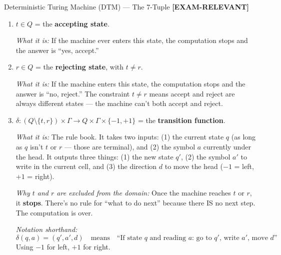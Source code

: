 \documentclass[11pt,a4paper]{article}
\newcommand{\kemark}{\textcolor{red!70!black}{\textbf{[EXAM-RELEVANT]}}}
\begin{document}
\begin{definitionbox}{Deterministic Turing Machine (DTM) --- The 7-Tuple \kemark}
\begin{enumerate}
\textit{What it is:} The state the machine is in at the very beginning, before it reads anything.

\textit{In our example:} $s = q_r$.

\item $t \in Q$ = the \textbf{accepting state}.

\textit{What it is:} If the machine ever enters this state, the computation stops and the answer is ``yes, accept.''

\item $r \in Q$ = the \textbf{rejecting state}, with $t \neq r$.

\textit{What it is:} If the machine enters this state, the computation stops and the answer is ``no, reject.'' The constraint $t \neq r$ means accept and reject are always different states --- the machine can't both accept and reject.

\item $\delta\colon (Q \setminus \{t, r\}) \times \Gamma \to Q \times \Gamma \times \{-1, +1\}$ = the \textbf{transition function}.

\textit{What it is:} The rule book. It takes two inputs: (1) the current state $q$ (as long as $q$ isn't $t$ or $r$ --- those are terminal), and (2) the symbol $a$ currently under the head. It outputs three things: (1) the new state $q'$, (2) the symbol $a'$ to write in the current cell, and (3) the direction $d$ to move the head ($-1$ = left, $+1$ = right).

\textit{Why $t$ and $r$ are excluded from the domain:} Once the machine reaches $t$ or $r$, it \textbf{stops}. There's no rule for ``what to do next'' because there IS no next step. The computation is over.

\textit{Notation shorthand:}
$$\delta(q, a) = (q', a', d) \quad \text{means} \quad \text{``If state $q$ and reading $a$: go to $q'$, write $a'$, move $d$''}$$
Using $-1$ for left, $+1$ for right.
\end{enumerate}
\end{definitionbox}
\end{document}
